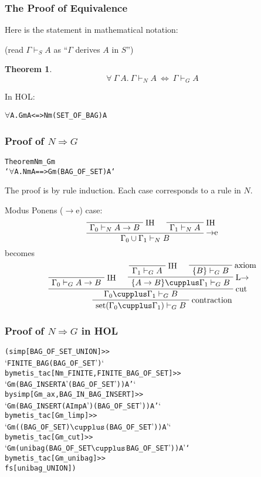\documentclass[english,svgnames,hide notes,12pt]{beamer}
\newtheorem{thm}{Theorem}
\theoremstyle{definition}
\theoremstyle{remark}
\begin{document}
\begin{frame}[fragile]
    \frametitle{The Proof of Equivalence}
    Here is the statement in mathematical notation:
    
    (read $\Gamma\vdash_S A$ as ``$\Gamma$ derives $A$ in $S$'')
    \begin{thm}
        \[\forall ~\Gamma ~A. ~\Gamma \vdash_N A ~\Leftrightarrow~ \Gamma \vdash_G A\]
    \end{thm}
    In HOL:

    \begin{alltt}
        \(\forall\) \textGamma A. Gm \textGamma A <=> Nm (SET_OF_BAG \textGamma) A
    \end{alltt}
\end{frame}

\begin{frame}[fragile]
    \frametitle{Proof of $N\Rightarrow G$}
\small
\begin{alltt}
Theorem Nm_Gm 
    `\(\forall\) \textGamma A. Nm \textGamma A ==> Gm (BAG_OF_SET \textGamma) A`
\end{alltt}
The proof is by rule induction. Each case corresponds to a rule in $N$.

Modus Ponens ($\to$e) case:
\[
    \AxiomC{}
    \RightLabel{IH}
    \UnaryInfC{$\Gamma_0\vdash_N A\to B$}
    \AxiomC{}
    \RightLabel{IH}
    \UnaryInfC{$\Gamma_1\vdash_N A$}
    \RightLabel{$\to$e}
    \BinaryInfC{$\Gamma_0\cup\Gamma_1 \vdash_N B$}
    \DisplayProof
\]
becomes
\[
    \AxiomC{}
    \RightLabel{IH}
    \UnaryInfC{$\Gamma_0 \vdash_G A \to B$}
    \AxiomC{}
    \RightLabel{IH}
    \UnaryInfC{$\Gamma_1 \vdash_G A$}
    \AxiomC{}
    \RightLabel{axiom}
    \UnaryInfC{$\{B\} \vdash_G B$}
    \RightLabel{L$\to$}
    \BinaryInfC{$\{A\to B\}\cupplus\Gamma_1\vdash_G B$}
    \RightLabel{cut}
    \BinaryInfC{$\Gamma_0\cupplus\Gamma_1\vdash_G B$}
    \RightLabel{contraction}
    \UnaryInfC{$\text{set}(\Gamma_0\cupplus\Gamma_1)\vdash_G B$}
    \DisplayProof
\]

\end{frame}

\begin{frame}[fragile] 
    \frametitle{Proof of $N\Rightarrow G$ in HOL}
    \small
\begin{alltt}
(simp[BAG_OF_SET_UNION] >>
`FINITE_BAG (BAG_OF_SET \textGamma')` 
  by metis_tac[Nm_FINITE,FINITE_BAG_OF_SET] >>
`Gm (BAG_INSERT A' (BAG_OF_SET \textGamma')) A'`
  by simp[Gm_ax,BAG_IN_BAG_INSERT] >>
`Gm (BAG_INSERT (A Imp A') (BAG_OF_SET \textGamma')) A'`
  by metis_tac[Gm_limp] >>
`Gm ((BAG_OF_SET \textGamma) \(\cupplus\) (BAG_OF_SET \textGamma')) A'`
  by metis_tac[Gm_cut] >>
`Gm (unibag (BAG_OF_SET \textGamma \(\cupplus\) BAG_OF_SET \textGamma')) A'` 
  by metis_tac[Gm_unibag] >>
fs[unibag_UNION])
\end{alltt}
\end{frame}
\end{document}
